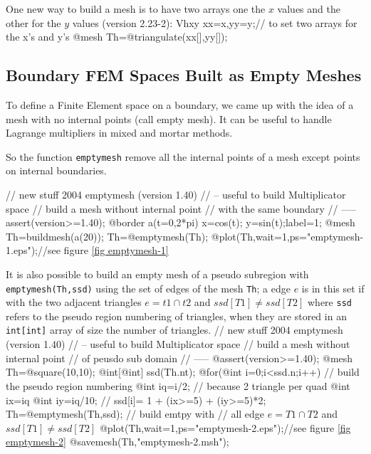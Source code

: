 \documentclass[a4paper,twoside,12pt]{book}
\begin{document}
One  new way to build a mesh is to have two arrays one  the $x$ values and the other for the $y$ values (version 2.23-2):
\bFF
Vhxy xx=x,yy=y;// to set two arrays for the x's and y's
@mesh Th=@triangulate(xx[],yy[]);
\eFF

\subsection{Boundary FEM Spaces Built as Empty Meshes}
To define a Finite Element space on a boundary,
we came up with the idea of a mesh with no internal points (call empty mesh).
It can be useful to handle Lagrange multipliers in mixed and mortar methods.

So the function \texttt{emptymesh} remove all the internal points of a mesh except
points  on  internal boundaries.

\bFF
{  //  new stuff 2004 emptymesh (version 1.40)
 // -- useful to build Multiplicator space
 //  build a mesh without internal point
 // with the same boundary
 //  -----
  assert(version>=1.40);
  @border a(t=0,2*pi){ x=cos(t); y=sin(t);label=1;}
  @mesh Th=buildmesh(a(20));
   Th=@emptymesh(Th);
  @plot(Th,wait=1,ps="emptymesh-1.eps");//see figure \ref{fig emptymesh-1}
}
\eFF

It is also possible to build an empty mesh of a pseudo subregion
with \texttt{emptymesh(Th,ssd)} using the set of edges of the mesh \texttt{Th};
a edge $e$ is in  this set  if with the two adjacent triangles $e =t1\cap t2$
and  $ ssd[T1] \neq ssd[T2]$ where \texttt{ssd}  refers to the pseudo region
numbering of triangles, when they are stored in an \texttt{int[int]} array of size the number of triangles.
\bFF
{  //  new stuff 2004 emptymesh (version 1.40) \hfilll
 // -- useful to build Multiplicator space \hfilll
 //  build a mesh without internal point \hfilll
 // of peusdo sub domain  \hfilll
 //  ----- \hfilll
  @assert(version>=1.40);
  @mesh Th=@square(10,10);
  @int[@int] ssd(Th.nt);
  @for(@int i=0;i<ssd.n;i++) // build the  pseudo region numbering
   {  @int iq=i/2;   // because 2 triangle per quad
      @int ix=iq%
      @int iy=iq/10; //
    ssd[i]= 1 + (ix>=5) +  (iy>=5)*2;
   }
  Th=@emptymesh(Th,ssd); // build emtpy  with
  //  all edge $e = T1 \cap T2$ and $ ssd[T1] \neq ssd[T2]$
  @plot(Th,wait=1,ps="emptymesh-2.eps");//see figure \ref{fig emptymesh-2}
  @savemesh(Th,"emptymesh-2.msh");
}
\eFF

\end{document}
